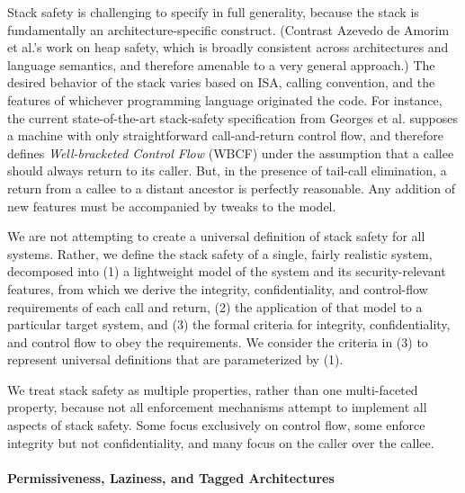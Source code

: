 Stack safety is challenging to specify in full generality, because the stack is fundamentally
an architecture-specific construct. (Contrast Azevedo de Amorim et al.'s \cite{DBLP:conf/post/AmorimHP18} work on heap safety,
which is broadly consistent across architectures and language semantics, and therefore amenable
to a very general approach.)
The desired behavior of the stack varies based on ISA, calling convention,
and the features of whichever programming language originated the code.
For instance, the current state-of-the-art stack-safety specification from Georges et al.
\cite{Georges22:TempsDesCerises} supposes a machine with only straightforward call-and-return
control flow, and therefore defines {\it Well-bracketed Control Flow} (WBCF) under the assumption that
a callee should always return to its caller. But, in the presence of tail-call elimination, a
return from a callee to a distant ancestor is perfectly reasonable. Any addition of new features
must be accompanied by tweaks to the model.
%

We are not attempting to create a universal definition of stack safety for all systems.
Rather, we define the stack safety of a single, fairly realistic system, decomposed into
(1) a lightweight model of the system and its security-relevant features, from which we
derive the integrity, confidentiality, and control-flow requirements of each call and
return, (2) the application of that model to a particular target system, and (3)
the formal criteria for integrity, confidentiality, and control flow
to obey the requirements. We consider the criteria in (3) to represent universal definitions
that are parameterized by (1).
%

We treat stack safety as multiple properties, rather than one multi-faceted property, because
not all enforcement mechanisms attempt to implement all aspects of stack safety. Some focus
exclusively on control flow, some enforce integrity but not confidentiality, and many
focus on the caller over the callee.
%

\paragraph*{Permissiveness, Laziness, and Tagged Architectures}

